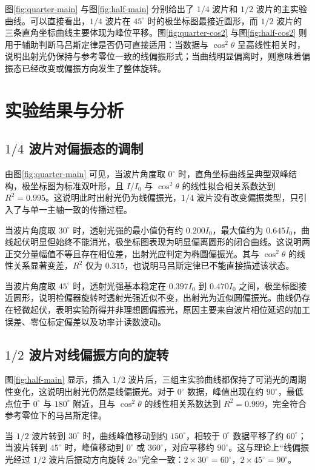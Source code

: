 \documentclass[12pt,a4paper]{article}
\begin{document}
图\ref{fig:quarter-main} 与图\ref{fig:half-main} 分别给出了 $1/4$ 波片和 $1/2$ 波片的主实验曲线。可以直接看出，$1/4$ 波片在 $45^{\circ}$ 时的极坐标图最接近圆形，而 $1/2$ 波片的三条直角坐标曲线主要体现为峰位平移。图\ref{fig:quarter-cos2} 与图\ref{fig:half-cos2} 则用于辅助判断马吕斯定律是否仍可直接适用：当数据与 $\cos^2\theta$ 呈高线性相关时，说明出射光仍保持与参考零位一致的线偏振形式；当曲线明显偏离时，则意味着偏振态已经改变或偏振方向发生了整体旋转。

\section{实验结果与分析}
\subsection{$1/4$ 波片对偏振态的调制}
由图\ref{fig:quarter-main} 可见，当波片角度取 $0^{\circ}$ 时，直角坐标曲线呈典型双峰结构，极坐标图为标准双叶形，且 $I/I_0$ 与 $\cos^2\theta$ 的线性拟合相关系数达到 $R^2=0.995$。这说明此时出射光仍为线偏振光，$1/4$ 波片没有改变偏振类型，只引入了与单一主轴一致的传播过程。

当波片角度取 $30^{\circ}$ 时，透射光强的最小值仍有约 $0.200I_0$，最大值约为 $0.645I_0$，曲线起伏明显但始终不能消光，极坐标图表现为明显偏离圆形的闭合曲线。这说明两正交分量幅值不等且存在相位差，出射光应判定为椭圆偏振光。其与 $\cos^2\theta$ 的线性关系显著变差，$R^2$ 仅为 $0.315$，也说明马吕斯定律已不能直接描述该状态。

当波片角度取 $45^{\circ}$ 时，透射光强基本稳定在 $0.397I_0$ 到 $0.470I_0$ 之间，极坐标图接近圆形，说明检偏器旋转时透射光强近似不变，出射光为近似圆偏振光。曲线仍存在轻微起伏，表明实验所得并非理想圆偏振光，原因主要来自波片相位延迟的加工误差、零位标定偏差以及功率计读数波动。

\subsection{$1/2$ 波片对线偏振方向的旋转}
图\ref{fig:half-main} 显示，插入 $1/2$ 波片后，三组主实验曲线都保持了可消光的周期性变化，这说明出射光仍然是线偏振光。对于 $0^{\circ}$ 数据，峰值出现在约 $90^{\circ}$，最低点位于 $0^{\circ}$ 与 $180^{\circ}$ 附近，且与 $\cos^2\theta$ 的线性相关系数达到 $R^2=0.999$，完全符合参考零位下的马吕斯定律。

当 $1/2$ 波片转到 $30^{\circ}$ 时，曲线峰值移动到约 $150^{\circ}$，相较于 $0^{\circ}$ 数据平移了约 $60^{\circ}$；当波片转到 $45^{\circ}$ 时，峰值移动到 $0^{\circ}$ 或 $360^{\circ}$，对应平移约 $90^{\circ}$。这与理论上“线偏振光经过 $1/2$ 波片后振动方向旋转 $2\alpha$”完全一致：$2\times30^{\circ}=60^{\circ}$，$2\times45^{\circ}=90^{\circ}$。
\end{document}
